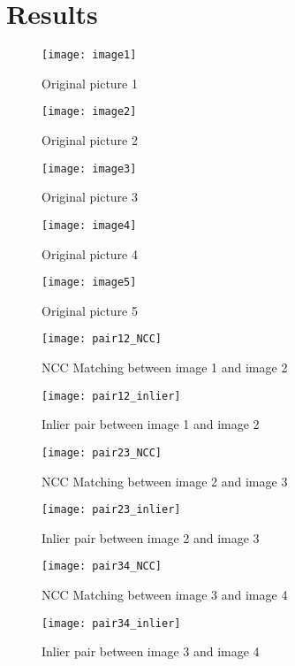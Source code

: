 \documentclass[11pt]{article}
\begin{document}
\section*{Results}

\begin{figure}[H]
\centering
\texttt{[image: image1]}
\caption{Original picture 1}
\label{}
\end{figure}
\begin{figure}[H]
\centering
\texttt{[image: image2]}
\caption{Original picture 2}
\label{}
\end{figure}
\begin{figure}[H]
\centering
\texttt{[image: image3]}
\caption{Original picture 3}
\label{}
\end{figure}
\begin{figure}[H]
\centering
\texttt{[image: image4]}
\caption{Original picture 4}
\label{}
\end{figure}
\begin{figure}[H]
\centering
\texttt{[image: image5]}
\caption{Original picture 5}
\label{}
\end{figure}

\begin{figure}[H]
\centering
\texttt{[image: pair12\_NCC]}
\caption{NCC Matching between image 1 and image 2}
\label{}
\end{figure}
\begin{figure}[H]
\centering
\texttt{[image: pair12\_inlier]}
\caption{Inlier pair between image 1 and image 2}
\label{}
\end{figure}

\begin{figure}[H]
\centering
\texttt{[image: pair23\_NCC]}
\caption{NCC Matching between image 2 and image 3}
\label{}
\end{figure}
\begin{figure}[H]
\centering
\texttt{[image: pair23\_inlier]}
\caption{Inlier pair between image 2 and image 3}
\label{}
\end{figure}

\begin{figure}[H]
\centering
\texttt{[image: pair34\_NCC]}
\caption{NCC Matching between image 3 and image 4}
\label{}
\end{figure}
\begin{figure}[H]
\centering
\texttt{[image: pair34\_inlier]}
\caption{Inlier pair between image 3 and image 4}
\label{}
\end{figure}
\end{document}

